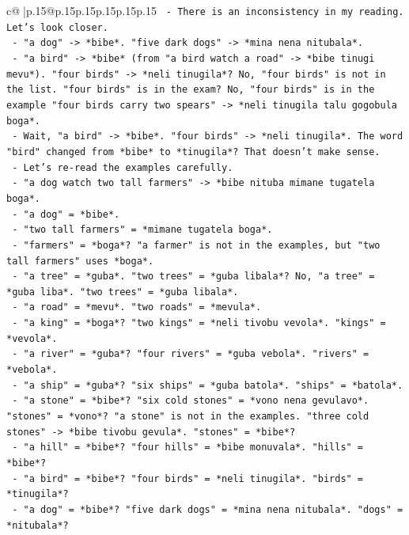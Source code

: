 \documentclass{article}
\begin{document}
{\begin{supertabular}{c@{$\;$}|p{.15\linewidth}@{}p{.15\linewidth}p{.15\linewidth}p{.15\linewidth}p{.15\linewidth}p{.15\linewidth}}
{{{\texttt{  {-} There is an inconsistency in my reading. Let's look closer.} \\
\texttt{  {-} "a dog" {-}> *bibe*. "five dark dogs" {-}> *mina nena nitubala*.} \\
\texttt{  {-} "a bird" {-}> *bibe* (from "a bird watch a road" {-}> *bibe tinugi mevu*). "four birds" {-}> *neli tinugila*? No, "four birds" is not in the list. "four birds" is in the exam? No, "four birds" is in the example "four birds carry two spears" {-}> *neli tinugila talu gogobula boga*.} \\
\texttt{  {-} Wait, "a bird" {-}> *bibe*. "four birds" {-}> *neli tinugila*. The word "bird" changed from *bibe* to *tinugila*? That doesn't make sense.} \\
\texttt{  {-} Let's re{-}read the examples carefully.} \\
\texttt{  {-} "a dog watch two tall farmers" {-}> *bibe nituba mimane tugatela boga*.} \\
\texttt{    {-} "a dog" = *bibe*.} \\
\texttt{    {-} "two tall farmers" = *mimane tugatela boga*.} \\
\texttt{    {-} "farmers" = *boga*? "a farmer" is not in the examples, but "two tall farmers" uses *boga*.} \\
\texttt{    {-} "a tree" = *guba*. "two trees" = *guba libala*? No, "a tree" = *guba liba*. "two trees" = *guba libala*.} \\
\texttt{    {-} "a road" = *mevu*. "two roads" = *mevula*.} \\
\texttt{    {-} "a king" = *boga*? "two kings" = *neli tivobu vevola*. "kings" = *vevola*.} \\
\texttt{    {-} "a river" = *guba*? "four rivers" = *guba vebola*. "rivers" = *vebola*.} \\
\texttt{    {-} "a ship" = *guba*? "six ships" = *guba batola*. "ships" = *batola*.} \\
\texttt{    {-} "a stone" = *bibe*? "six cold stones" = *vono nena gevulavo*. "stones" = *vono*? "a stone" is not in the examples. "three cold stones" {-}> *bibe tivobu gevula*. "stones" = *bibe*?} \\
\texttt{    {-} "a hill" = *bibe*? "four hills" = *bibe monuvala*. "hills" = *bibe*?} \\
\texttt{    {-} "a bird" = *bibe*? "four birds" = *neli tinugila*. "birds" = *tinugila*?} \\
\texttt{    {-} "a dog" = *bibe*? "five dark dogs" = *mina nena nitubala*. "dogs" = *nitubala*?} \\
}}}
\end{supertabular}}
\end{document}
